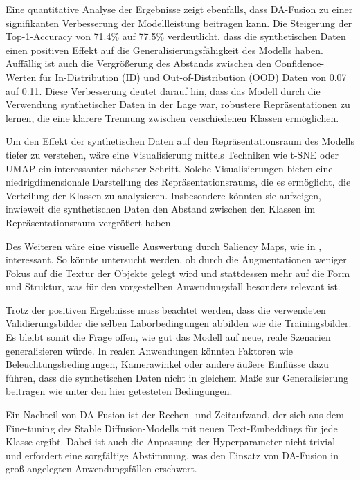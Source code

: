 Eine quantitative Analyse der Ergebnisse zeigt ebenfalls, dass DA-Fusion zu einer signifikanten Verbesserung der Modellleistung beitragen kann. Die Steigerung der Top-1-Accuracy von 71.4\% auf 77.5\% verdeutlicht, dass die synthetischen Daten einen positiven Effekt auf die Generalisierungsfähigkeit des Modells haben. Auffällig ist auch die Vergrößerung des Abstands zwischen den Confidence-Werten für In-Distribution (ID) und Out-of-Distribution (OOD) Daten von 0.07 auf 0.11. Diese Verbesserung deutet darauf hin, dass das Modell durch die Verwendung synthetischer Daten in der Lage war, robustere Repräsentationen zu lernen, die eine klarere Trennung zwischen verschiedenen Klassen ermöglichen.

Um den Effekt der synthetischen Daten auf den Repräsentationsraum des Modells tiefer zu verstehen, wäre eine Visualisierung mittels Techniken wie t-SNE \parencite{Vandermaaten2008tsne} oder UMAP \parencite{Mcinnes2020umap} ein interessanter nächster Schritt. Solche Visualisierungen bieten eine niedrigdimensionale Darstellung des Repräsentationsraums, die es ermöglicht, die Verteilung der Klassen zu analysieren. Insbesondere könnten sie aufzeigen, inwieweit die synthetischen Daten den Abstand zwischen den Klassen im Repräsentationsraum vergrößert haben.

Des Weiteren wäre eine visuelle Auswertung durch Saliency Maps, wie in \parencite{Sammani2023visualizingunderstandingcontrastivelearning}, interessant. So könnte untersucht werden, ob durch die Augmentationen weniger Fokus auf die Textur der Objekte gelegt wird und stattdessen mehr auf die Form und Struktur, was für den vorgestellten Anwendungsfall besonders relevant ist.

Trotz der positiven Ergebnisse muss beachtet werden, dass die verwendeten Validierungsbilder die selben Laborbedingungen abbilden wie die Trainingsbilder. Es bleibt somit die Frage offen, wie gut das Modell auf neue, reale Szenarien generalisieren würde. In realen Anwendungen könnten Faktoren wie Beleuchtungsbedingungen, Kamerawinkel oder andere äußere Einflüsse dazu führen, dass die synthetischen Daten nicht in gleichem Maße zur Generalisierung beitragen wie unter den hier getesteten Bedingungen.

Ein Nachteil von DA-Fusion ist der Rechen- und Zeitaufwand, der sich aus dem Fine-tuning des Stable Diffusion-Modells mit neuen Text-Embeddings für jede Klasse ergibt. Dabei ist auch die Anpassung der Hyperparameter nicht trivial und erfordert eine sorgfältige Abstimmung, was den Einsatz von DA-Fusion in groß angelegten Anwendungsfällen erschwert.

